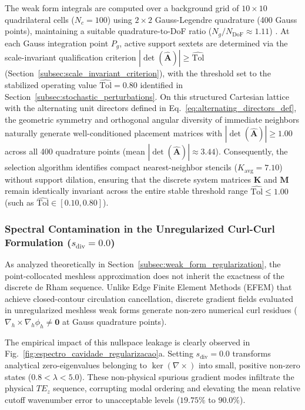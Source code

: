 \documentclass[preprint,12pt]{elsarticle}
\begin{document}
The weak form integrals are computed over a background grid of $10 \times 10$ quadrilateral cells ($N_c = 100$) using $2 \times 2$ Gauss-Legendre quadrature (400 Gauss points), maintaining a suitable quadrature-to-DoF ratio ($N_g / N_{\mathrm{DoF}} \approx 1.11$) \cite{belytschko1994element, liu2005introduction, liu2009mesh}. At each Gauss integration point $P_g$, active support sextets are determined via the scale-invariant qualification criterion $|\det(\widehat{\mathbf{A}})| \ge \widehat{\mathrm{Tol}}$ (Section~\ref{subsec:scale_invariant_criterion}), with the threshold set to the stabilized operating value $\widehat{\mathrm{Tol}} = 0.80$ identified in Section~\ref{subsec:stochastic_perturbations}. On this structured Cartesian lattice with the alternating unit directors defined in Eq.~\eqref{eq:alternating_directors_def}, the geometric symmetry and orthogonal angular diversity of immediate neighbors naturally generate well-conditioned placement matrices with $|\det(\widehat{\mathbf{A}})| \ge 1.00$ across all 400 quadrature points (mean $|\det(\widehat{\mathbf{A}})| \approx 3.44$). Consequently, the selection algorithm identifies compact nearest-neighbor stencils ($K_{\mathrm{avg}} = 7.10$) without support dilation, ensuring that the discrete system matrices $\mathbf{K}$ and $\mathbf{M}$ remain identically invariant across the entire stable threshold range $\widehat{\mathrm{Tol}} \le 1.00$ (such as $\widehat{\mathrm{Tol}} \in [0.10, 0.80]$).

\subsubsection{Spectral Contamination in the Unregularized Curl-Curl Formulation (\texorpdfstring{$s_{\mathrm{div}} = 0.0$}{s(div) = 0.0})}
\label{subsubsec:unregularized_formulation}

As analyzed theoretically in Section~\ref{subsec:weak_form_regularization}, the point-collocated meshless approximation does not inherit the exactness of the discrete de Rham sequence. Unlike Edge Finite Element Methods (EFEM) that achieve closed-contour circulation cancellation, discrete gradient fields evaluated in unregularized meshless weak forms generate non-zero numerical curl residues ($\nabla_h \times \nabla_h \phi_h \neq \mathbf{0}$ at Gauss quadrature points).

The empirical impact of this nullspace leakage is clearly observed in Fig.~\ref{fig:espectro_cavidade_regularizacao}a. Setting $s_{\mathrm{div}} = 0.0$ transforms analytical zero-eigenvalues belonging to $\ker(\nabla \times)$ into small, positive non-zero states ($0.8 < \lambda < 5.0$). These non-physical spurious gradient modes infiltrate the physical $TE_z$ sequence, corrupting modal ordering and elevating the mean relative cutoff wavenumber error to unacceptable levels ($19.75\%$ to $90.0\%$).
\end{document}
